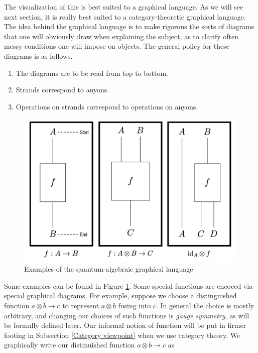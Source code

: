 \documentclass{article}
\theoremstyle{definition}
\numberwithin{figure}{section}
\begin{document}
\begin{enumerate}[\thesection .1.]
The visualization of this is best suited to a graphical language. As we will see next section, it is really best suited to a category-theoretic graphical language. The idea behind the graphical language is to make rigorous the sorts of diagrams that one will obviously draw when explaining the subject, as to clarify often messy conditions one will impose on objects. The general policy for these diagrams is as follows.

\begin{enumerate}
\item The diagrams are to be read from top to bottom.
\item Strands correspond to anyons.
\item Operations on strands correspond to operations on anyons.
\end{enumerate}

\begin{figure}
\begin{center}
\includegraphics[scale=0.2]{graphical-language}
\caption{Examples of the quantum-algebraic graphical language}
\label{fig:graphical-language}
\end{center}
\end{figure}

Some examples can be found in Figure \ref{fig:graphical-language}. Some special functions are encoced via special graphical diagrams. For example, suppose we choose a distinguished function $a\otimes b\to c$ to represent $a\otimes b$ fusing into $c$. In general the choice is mostly arbitrary, and changing our choices of such functions is \textit{gauge symmetry}, as will be formally defined later. Our informal notion of function will be put in firmer footing in Subsection \ref{Category viewpoint} when we use category theory. We graphically write our distinuished function $a\otimes b\to c$ as


\end{enumerate}
\end{document}
